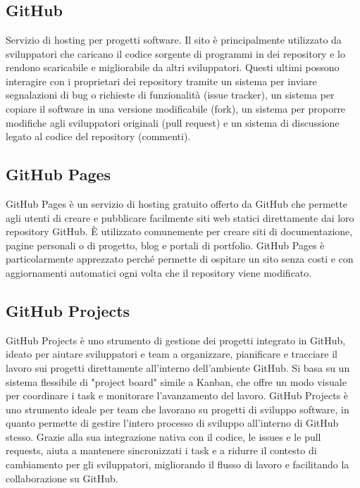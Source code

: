 
\section{}

\subsection*{GitHub}
Servizio di hosting per progetti software. Il sito è principalmente utilizzato da sviluppatori che caricano il codice sorgente di programmi in dei 
repository e lo rendono scaricabile e migliorabile da altri sviluppatori. Questi ultimi possono interagire con i proprietari dei repository tramite un 
sistema per inviare segnalazioni di bug o richieste di funzionalità (issue tracker), un sistema per copiare il software in una versione modificabile 
(fork), un sistema per proporre modifiche agli sviluppatori originali (pull request) e un sistema di discussione legato al codice del repository (commenti).

\subsection*{GitHub Pages}
GitHub Pages è un servizio di hosting gratuito offerto da GitHub che permette agli utenti di creare e pubblicare facilmente siti web statici direttamente 
dai loro repository GitHub. È utilizzato comunemente per creare siti di documentazione, pagine personali o di progetto, blog e portali di portfolio. 
GitHub Pages è particolarmente apprezzato perché permette di ospitare un sito senza costi e con aggiornamenti automatici ogni volta che il repository 
viene modificato.

\subsection*{GitHub Projects}
GitHub Projects è uno strumento di gestione dei progetti integrato in GitHub, ideato per aiutare sviluppatori e team a organizzare, pianificare e tracciare 
il lavoro sui progetti direttamente all'interno dell'ambiente GitHub. Si basa su un sistema flessibile di "project board" simile a Kanban, che offre un modo 
visuale per coordinare i task e monitorare l’avanzamento del lavoro. GitHub Projects è uno strumento ideale per team che lavorano su progetti di sviluppo 
software, in quanto permette di gestire l’intero processo di sviluppo all'interno di GitHub stesso. Grazie alla sua integrazione nativa con il codice, le 
issues e le pull requests, aiuta a mantenere sincronizzati i task e a ridurre il contesto di cambiamento per gli sviluppatori, migliorando il flusso di 
lavoro e facilitando la collaborazione su GitHub.

